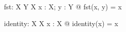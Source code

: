 \documentclass[a4paper,10pt,fleqn]{article}
\begin{document}
\begin{gendef}[X, Y]
  fst: X \cross Y \fun X
\where
  \forall x : X; y : Y @ fst(x, y) = x
\end{gendef}

\begin{gendef}[X]
  identity: X \fun X
\where
  \forall x : X @ identity(x) = x
\end{gendef}
\end{document}
